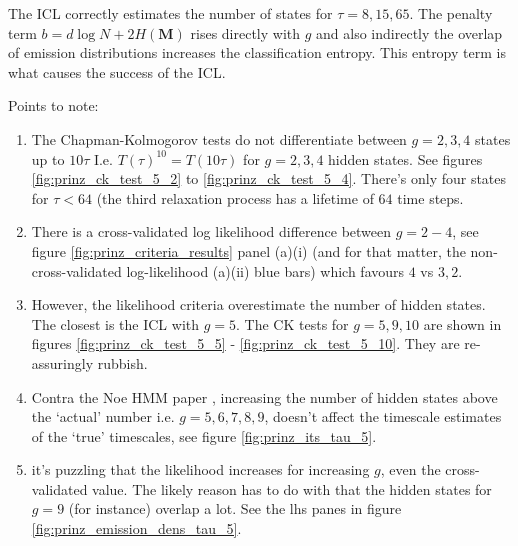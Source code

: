 The ICL correctly estimates the number of states for $\tau = 8, 15,  65$. The penalty term $b=d\log{N}+2H(\mathbf{M})$ rises directly with $g$ and also indirectly the overlap of emission distributions increases the classification entropy. This entropy term is what causes the success of the ICL. 

Points to note: 
\begin{enumerate}
    \item The Chapman-Kolmogorov tests do not differentiate between $g = 2, 3, 4$ states up to $10\tau$ I.e. $T(\tau)^10 = T(10\tau)$ for $g = 2, 3, 4$ hidden states. See figures \ref{fig:prinz_ck_test_5_2} to \ref{fig:prinz_ck_test_5_4}. There's only four states for $\tau < 64$ (the third relaxation process has a lifetime of $64$ time steps. 
    \item There is a cross-validated log likelihood difference between $g = 2 - 4$, see figure \ref{fig:prinz_criteria_results} panel (a)(i) (and for that matter, the non-cross-validated log-likelihood (a)(ii) blue bars) which favours $4$ vs $3,2$. 
    \item However, the likelihood criteria overestimate the number of hidden states. The closest is the ICL with $g=5$. The CK tests for $g=5, 9, 10$ are shown in figures \ref{fig:prinz_ck_test_5_5} - \ref{fig:prinz_ck_test_5_10}. They are re-assuringly rubbish. 
    \item Contra the Noe HMM paper \cite{noeProjectedHiddenMarkov2013a}, increasing the number of hidden states above the `actual' number i.e. $g = 5, 6, 7, 8, 9$, doesn't affect the timescale estimates of the `true' timescales, see figure \ref{fig:prinz_its_tau_5}.
    \item it's puzzling that the likelihood increases for increasing $g$, even the cross-validated value. The likely reason has to do with that the hidden states for $g = 9$ (for instance) overlap a lot. See the lhs panes in figure \ref{fig:prinz_emission_dens_tau_5}.  
\end{enumerate}









